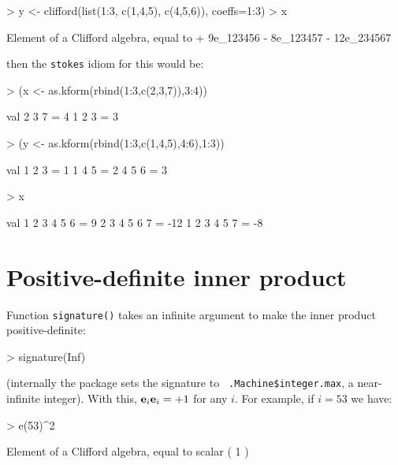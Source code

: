 \documentclass{birkjour}
\theoremstyle{definition}
\theoremstyle{remark}
\numberwithin{equation}{section}
\begin{document}
\begin{Schunk}
\begin{Sinput}
> y <- clifford(list(1:3, c(1,4,5), c(4,5,6)), coeffs=1:3)
> x %
\end{Sinput}
\begin{Soutput}
Element of a Clifford algebra, equal to
+ 9e_123456 - 8e_123457 - 12e_234567
\end{Soutput}
\end{Schunk}
%
then the {\tt stokes} idiom for this would be:

\begin{Schunk}
\begin{Sinput}
> (x <- as.kform(rbind(1:3,c(2,3,7)),3:4))
\end{Sinput}
\begin{Soutput}
           val
 2 3 7  =    4
 1 2 3  =    3
\end{Soutput}
\begin{Sinput}
> (y <- as.kform(rbind(1:3,c(1,4,5),4:6),1:3))
\end{Sinput}
\begin{Soutput}
           val
 1 2 3  =    1
 1 4 5  =    2
 4 5 6  =    3
\end{Soutput}
\begin{Sinput}
> x %
\end{Sinput}
\begin{Soutput}
                 val
 1 2 3 4 5 6  =    9
 2 3 4 5 6 7  =  -12
 1 2 3 4 5 7  =   -8
\end{Soutput}
\end{Schunk}

\section{Positive-definite inner product}

Function {\tt signature()} takes an infinite argument to make the
inner product positive-definite:

\begin{Schunk}
\begin{Sinput}
> signature(Inf)
\end{Sinput}
\end{Schunk}
%
(internally the package sets the signature to {\tt
  .Machine\$integer.max}, a near-infinite integer).  With this,
${\bf e}_{i}{\bf e}_{i}=+1$ for any $i$.  For example, if
  $i=53$ we have:

\begin{Schunk}
\begin{Sinput}
> e(53)^2
\end{Sinput}
\begin{Soutput}
Element of a Clifford algebra, equal to
scalar ( 1 )
\end{Soutput}
\end{Schunk}
\end{document}
